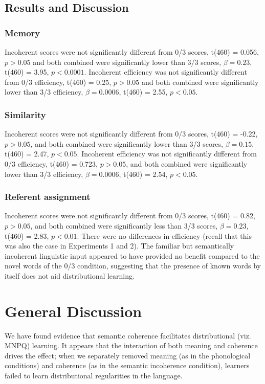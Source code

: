 \documentclass[man,floatsintext]{apa6}
\begin{document}
\subsection{Results and Discussion}

\subsubsection{Memory}
Incoherent scores were not significantly different from 0/3 scores, t(460) = 0.056, $p > 0.05$ and both combined were significantly lower than 3/3 scores, $\beta = 0.23$, t(460) = 3.95, $p < 0.0001$. Incoherent efficiency was not significantly different from 0/3 efficiency, t(460) = 0.25, $p > 0.05$ and both combined were significantly lower than 3/3 efficiency, $\beta = 0.0006$, t(460) = 2.55, $p < 0.05$.

\subsubsection{Similarity}
Incoherent scores were not significantly different from 0/3 scores, t(460) = -0.22, $p > 0.05$, and both combined were significantly lower than 3/3 scores, $\beta = 0.15$, t(460) = 2.47, $p < 0.05$. Incoherent efficiency was not significantly different from 0/3 efficiency, t(460) = 0.723, $p > 0.05$, and both combined were significantly lower than 3/3 efficiency, $\beta = 0.0006$, t(460) = 2.54, $p < 0.05$.

\subsubsection{Referent assignment}
Incoherent scores were not significantly different from 0/3 scores, t(460) = 0.82, $p > 0.05$, and both combined were significantly less than 3/3 scores, $\beta = 0.23$, t(460) = 2.83, $p < 0.01$. There were no differences in efficiency (recall that this was also the case in Experiments 1 and 2). The familiar but semantically incoherent linguistic input appeared to have provided no benefit compared to the novel words of the 0/3 condition, suggesting that the presence of known words by itself does not aid distributional learning.

\section{General Discussion}

We have found evidence that semantic coherence facilitates distributional (viz. MNPQ) learning. It appears that the interaction of both meaning and coherence drives the effect; when we separately removed meaning (as in the phonological conditions) and coherence (as in the semantic incoherence condition), learners failed to learn distributional regularities in the language.
\end{document}
